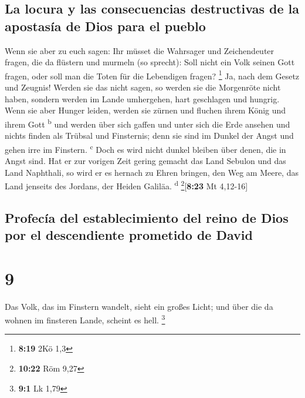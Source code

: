 \hypertarget{la-locura-y-las-consecuencias-destructivas-de-la-apostasuxeda-de-dios-para-el-pueblo}{%
\subsection{La locura y las consecuencias destructivas de la apostasía
de Dios para el
pueblo}\label{la-locura-y-las-consecuencias-destructivas-de-la-apostasuxeda-de-dios-para-el-pueblo}}

 Wenn sie aber zu euch sagen: Ihr müsset die Wahrsager
und Zeichendeuter fragen, die da flüstern und murmeln (so sprecht): Soll
nicht ein Volk seinen Gott fragen, oder soll man die Toten für die
Lebendigen fragen? \footnote{\textbf{8:19} 2Kö 1,3}  Ja,
nach dem Gesetz und Zeugnis! Werden sie das nicht sagen, so werden sie
die Morgenröte nicht haben,  sondern werden im Lande
umhergehen, hart geschlagen und hungrig. Wenn sie aber Hunger leiden,
werden sie zürnen und fluchen ihrem König und ihrem Gott
\textsuperscript{b}  und werden über sich gaffen und
unter sich die Erde ansehen und nichts finden als Trübsal und
Finsternis; denn sie sind im Dunkel der Angst und gehen irre im
Finstern. \textsuperscript{c}  Doch es wird nicht dunkel
bleiben über denen, die in Angst sind. Hat er zur vorigen Zeit gering
gemacht das Land Sebulon und das Land Naphthali, so wird er es hernach
zu Ehren bringen, den Weg am Meere, das Land jenseits des Jordans, der
Heiden Galiläa. \textsuperscript{d} \footnote{\textbf{10:22} Röm 9,27}{[}\textbf{8:23}
Mt 4,12-16{]}

\hypertarget{profecuxeda-del-establecimiento-del-reino-de-dios-por-el-descendiente-prometido-de-david}{%
\subsection{Profecía del establecimiento del reino de Dios por el
descendiente prometido de
David}\label{profecuxeda-del-establecimiento-del-reino-de-dios-por-el-descendiente-prometido-de-david}}

\hypertarget{section-8}{%
\section{9}\label{section-8}}

 Das Volk, das im Finstern wandelt, sieht ein großes
Licht; und über die da wohnen im finsteren Lande, scheint es hell.
\footnote{\textbf{9:1} Lk 1,79}

